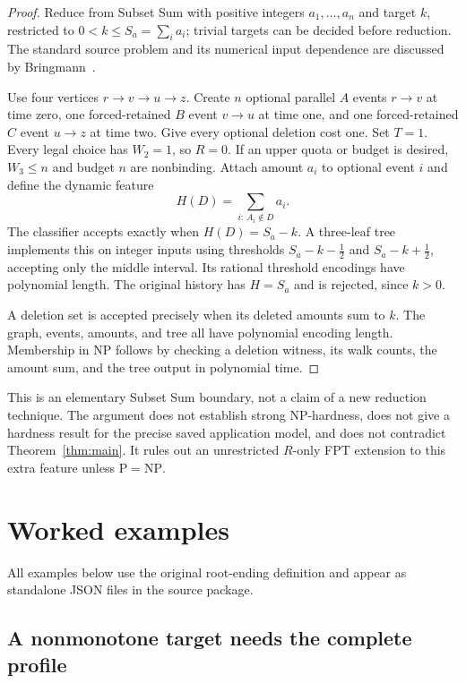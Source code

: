 \documentclass[11pt]{article}
\theoremstyle{remark}
\begin{document}
\begin{proof}
Reduce from Subset Sum with positive integers $a_1,\ldots,a_n$ and target
$k$, restricted to $0<k\le S_a=\sum_i a_i$; trivial targets can be decided
before reduction. The standard source problem and its numerical input
dependence are discussed by Bringmann~\citep{bringmann2017}.

Use four vertices $r\to v\to u\to z$. Create $n$ optional parallel $A$ events
$r\to v$ at time zero, one forced-retained $B$ event $v\to u$ at time one,
and one forced-retained $C$ event $u\to z$ at time two. Give every optional
deletion cost one. Set $T=1$. Every legal choice has $W_2=1$, so $R=0$.
If an upper quota or budget is desired, $W_3\le n$ and budget $n$ are
nonbinding. Attach amount $a_i$ to optional event $i$ and define the dynamic
feature
\[
 H(D)=\sum_{i:\,A_i\notin D}a_i.
\]
The classifier accepts exactly when $H(D)=S_a-k$. A three-leaf tree implements
this on integer inputs using thresholds $S_a-k-\tfrac12$ and
$S_a-k+\tfrac12$, accepting only the middle interval. Its rational threshold
encodings have polynomial length. The original history has $H=S_a$ and is
rejected, since $k>0$.

A deletion set is accepted precisely when its deleted amounts sum to $k$.
The graph, events, amounts, and tree all have polynomial encoding length.
Membership in NP follows by checking a deletion witness, its walk counts,
the amount sum, and the tree output in polynomial time.
\end{proof}

This is an elementary Subset Sum boundary, not a claim of a new reduction
technique. The argument does not establish strong NP-hardness, does not give
a hardness result for the precise saved application model, and does not
contradict Theorem~\ref{thm:main}. It rules out an unrestricted $R$-only FPT
extension to this extra feature unless $\mathrm{P}=\mathrm{NP}$.

\section{Worked examples}\label{sec:examples}

All examples below use the original root-ending definition and appear as
standalone JSON files in the source package.

\subsection{A nonmonotone target needs the complete profile}
\end{document}
